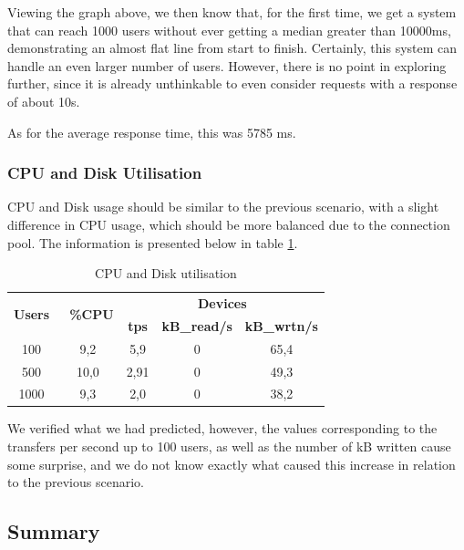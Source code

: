   Viewing the graph above, we then know that, for the first time, we get a system that can reach 1000 users without ever getting a median greater than 10000ms, demonstrating an almost flat line from start to finish. Certainly, this system can handle an even larger number of users. However, there is no point in exploring further, since it is already unthinkable to even consider requests with a response of about 10s.
  
  As for the average response time, this was 5785 ms.
  
  \subsubsection{CPU and Disk Utilisation}
  
  CPU and Disk usage should be similar to the previous scenario, with a slight difference in CPU usage, which should be more balanced due to the connection pool. The information is presented below in table \ref{tab:cpu_load}.

\begin{table}[h!]
\centering
\begin{tabular}{|c|c|c|c|c|} 
\hline
\multirow{2}{*}{\textbf{Users }} & \multirow{2}{*}{\textbf{~\%CPU}} & \multicolumn{3}{c|}{\textbf{Devices}}                     \\ 
\cline{3-5}
                                 &                                  & \textbf{tps} & \textbf{kB\_read/s} & \textbf{kB\_wrtn/s}  \\ 
\hline
100  & 9,2 & 5,9  & 0  & 65,4                   \\ 
\hline
500  & 10,0 & 2,91 & 0 & 49,3                    \\ 
\hline
1000 & 9,3 & 2,0 & 0 & 38,2                 \\ 
\hline
\end{tabular}\caption{\label{tab:cpu_load}CPU and Disk utilisation}
\end{table}

  We verified what we had predicted, however, the values corresponding to the transfers per second up to 100 users, as well as the number of kB written cause some surprise, and we do not know exactly what caused this increase in relation to the previous scenario.

  \subsection{Summary}
  
